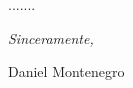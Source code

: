 \begin{acknowledgements}      

.......

\begin{flushright}
\textit{Sinceramente,}


Daniel Montenegro


\monthname \ \the\year
\end{flushright}


\end{acknowledgements}

